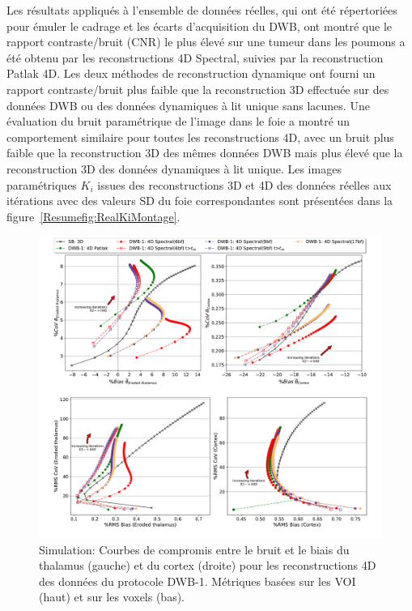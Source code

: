 Les résultats appliqués à l'ensemble de données réelles, qui ont été répertoriées pour émuler le cadrage et les écarts d'acquisition du DWB, ont montré que le rapport contraste/bruit (CNR) le plus élevé sur une tumeur dans les poumons a été obtenu par les reconstructions 4D Spectral, suivies par la reconstruction Patlak 4D. Les deux méthodes de reconstruction dynamique ont fourni un rapport contraste/bruit plus faible que la reconstruction 3D effectuée sur des données DWB ou des données dynamiques à lit unique sans lacunes. Une évaluation du bruit paramétrique de l'image dans le foie a montré un comportement similaire pour toutes les reconstructions 4D, avec un bruit plus faible que la reconstruction 3D des mêmes données DWB mais plus élevé que la reconstruction 3D des données dynamiques à lit unique.
Les images paramétriques $K_i$ issues des reconstructions 3D et 4D des données réelles aux itérations avec des valeurs SD du foie correspondantes sont présentées dans la figure~\ref{Resumefig:RealKiMontage}. 
%
\begin{figure} [ht!]
\centering
\includegraphics[scale=0.42,angle=0]{./Resume/3_2.pdf}
\caption{Simulation: Courbes de compromis entre le bruit et le biais du thalamus (gauche) et du cortex (droite) pour les reconstructions 4D des données du protocole DWB-1. Métriques basées sur les VOI (haut) et sur les voxels (bas).}
\label{Resumefig:3_2_DynamicModels}
\end{figure} 
%
